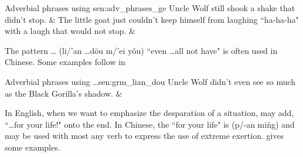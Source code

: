 \begin{tbls}{Adverbial phrases using }{sen:adv_phrases_ge}
  \tblx Uncle Wolf still shook a shake that didn't stop.
      & %
         \zhtsP
  \tblh The little goat just couldn't keep himself from laughing ``ha-ha-ha" with a laugh that would not stop.
      & %
        \zhtsP%
\end{tbls}


%
\hfill%
\begin{minipage}{\tw-75mm}%
  The pattern \ldots{} (li/'an \ldots d\=ou m/'ei y\v{o}u)
  ``even \ldots all not have"
  is often used in Chinese.
  Some examples follow in 
\end{minipage}

\begin{tbls}{Adverbial phrases using \ldots{}}{sen:grm_lian_dou}
    Uncle Wolf didn't even see so much as the Black Gorilla's shadow.
    & 
      \zhtsP
\end{tbls}


%
\hfill%
\begin{minipage}{\tw-40mm}
  In English, when we want to emphasize the desparation of a situation,
  may add, ``\ldots for your life!" onto the end.
  In Chinese, the ``for your life" is  (p/-an mi\`ng)
  and may be used with most any verb to express
  the use of extreme exertion.
   gives some examples.
\end{minipage}

